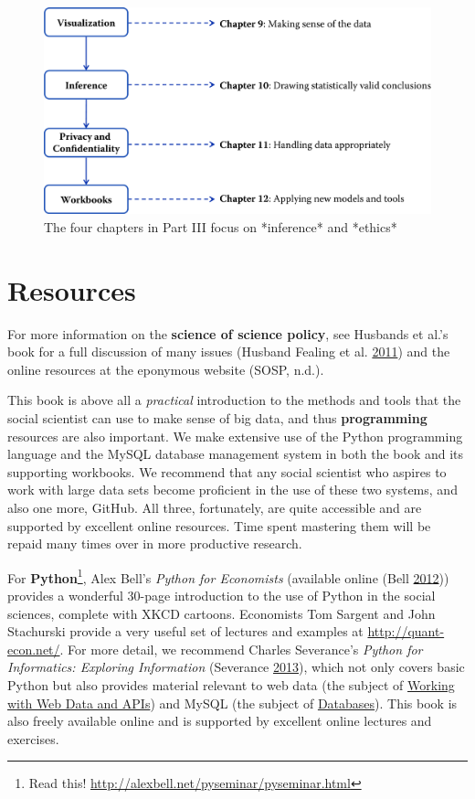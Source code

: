 \documentclass[]{krantz}
\begin{document}
\begin{figure}

{\centering \includegraphics[width=0.7\linewidth]{ChapterIntro/figures/Figure4} 

}

\caption{The four chapters in Part III focus on *inference* and *ethics*}\label{fig:fig5}
\end{figure}

\hypertarget{sec:intro:resources}{\section{Resources}\label{sec:intro:resources}}

For more information on the \textbf{science of science policy}, see
Husbands et al.'s book for a full discussion of many issues (Husband
Fealing et al. \protect\hyperlink{ref-husband2011science}{2011}) and the
online resources at the eponymous website (SOSP, n.d.).

This book is above all a \emph{practical} introduction to the methods
and tools that the social scientist can use to make sense of big data,
and thus \textbf{programming} resources are also important. We make
extensive use of the Python programming language and the MySQL database
management system in both the book and its supporting workbooks. We
recommend that any social scientist who aspires to work with large data
sets become proficient in the use of these two systems, and also one
more, GitHub. All three, fortunately, are quite accessible and are
supported by excellent online resources. Time spent mastering them will
be repaid many times over in more productive research.

For \textbf{Python}\footnote{Read this!
  \url{http://alexbell.net/pyseminar/pyseminar.html}}, Alex Bell's
\emph{Python for Economists} (available online (Bell
\protect\hyperlink{ref-BellPython}{2012})) provides a wonderful 30-page
introduction to the use of Python in the social sciences, complete with
XKCD cartoons. Economists Tom Sargent and John Stachurski provide a very
useful set of lectures and examples at \url{http://quant-econ.net/}. For
more detail, we recommend Charles Severance's \emph{Python for
Informatics: Exploring Information} (Severance
\protect\hyperlink{ref-SeverancePython}{2013}), which not only covers
basic Python but also provides material relevant to web data (the
subject of \protect\hyperlink{chap:web}{Working with Web Data and APIs})
and MySQL (the subject of \protect\hyperlink{chap:db}{Databases}). This
book is also freely available online and is supported by excellent
online lectures and exercises.
\end{document}
